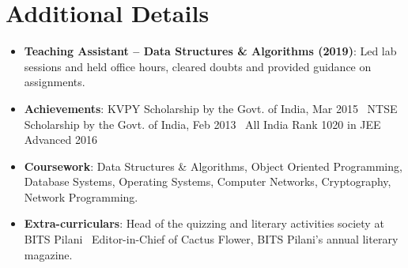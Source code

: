 \documentclass[a4paper,11pt]{article}
\newcommand{\resumeItem}[2]{
  \item\small{
    \textbf{#1}{: #2 \vspace{-2pt}}
  }
}
\newcommand{\resumeItemListStart}{\begin{itemize}}
\newcommand{\resumeItemListEnd}{\end{itemize}\vspace{-2pt}}
\begin{document}
\section{Additional Details}
\resumeItemListStart
\resumeItem{Teaching Assistant – Data Structures \& Algorithms (2019)}{Led lab sessions and held office hours, cleared doubts and provided guidance on assignments.}
\resumeItem{Achievements}{KVPY Scholarship by the Govt. of India, Mar 2015 \textbar\ NTSE Scholarship by the Govt. of India, Feb 2013 \textbar\ All India Rank 1020 in JEE Advanced 2016}
\resumeItem{Coursework}{Data Structures \& Algorithms, Object Oriented Programming, Database Systems, Operating Systems, Computer Networks, Cryptography, Network Programming.}
\resumeItem{Extra-curriculars}{Head of the quizzing and literary activities society at BITS Pilani \textbar\ Editor-in-Chief of Cactus Flower, BITS Pilani's annual literary magazine.}
\resumeItemListEnd

\end{document}
